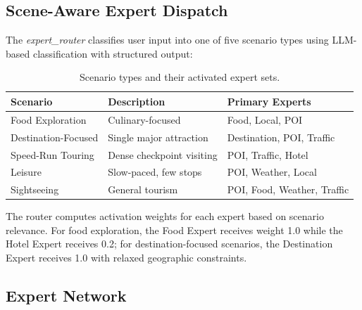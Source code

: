 \documentclass[11pt]{article}
\begin{document}
\subsection{Scene-Aware Expert Dispatch}

The \textit{expert\_router} classifies user input into one of five scenario types using LLM-based classification with structured output:

\begin{table}[h]
\centering
\caption{Scenario types and their activated expert sets.}
\label{tab:scenarios}
\begin{tabular}{@{}lll@{}}
\toprule
\textbf{Scenario} & \textbf{Description} & \textbf{Primary Experts} \\
\midrule
Food Exploration & Culinary-focused & Food, Local, POI \\
Destination-Focused & Single major attraction & Destination, POI, Traffic \\
Speed-Run Touring & Dense checkpoint visiting & POI, Traffic, Hotel \\
Leisure & Slow-paced, few stops & POI, Weather, Local \\
Sightseeing & General tourism & POI, Food, Weather, Traffic \\
\bottomrule
\end{tabular}
\end{table}

The router computes activation weights for each expert based on scenario relevance. For food exploration, the Food Expert receives weight 1.0 while the Hotel Expert receives 0.2; for destination-focused scenarios, the Destination Expert receives 1.0 with relaxed geographic constraints.

\subsection{Expert Network}
\end{document}
